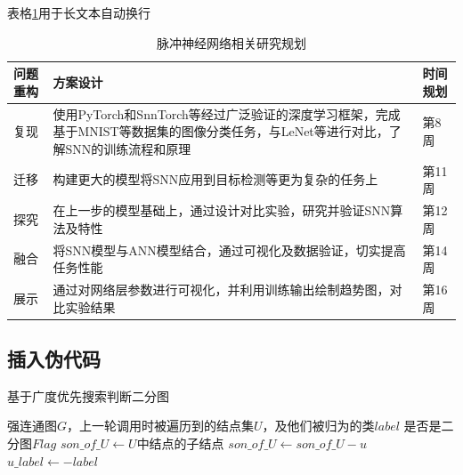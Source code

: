 \documentclass[a4paper]{article}
\begin{document}
表格\ref{table:todo}用于长文本自动换行
\begin{table}[!h]
    \centering
    \begin{tabular}{m{2cm}<{\centering} m{8cm}<{\centering} m{2cm}<{\centering}}
    \toprule
    问题重构 & 方案设计 & 时间规划 \\
    \midrule
    复现 & 使用PyTorch和SnnTorch等经过广泛验证的深度学习框架，完成基于MNIST等数据集的图像分类任务，与LeNet等进行对比，了解SNN的训练流程和原理 & 第8周\\ 
    \midrule
    迁移 & 构建更大的模型将SNN应用到目标检测等更为复杂的任务上 & 第11周\\ 
    \midrule
    探究 & 在上一步的模型基础上，通过设计对比实验，研究并验证SNN算法及特性 & 第12周\\ 
    \midrule
    融合 & 将SNN模型与ANN模型结合，通过可视化及数据验证，切实提高任务性能 & 第14周 \\ 
    \midrule
    展示 & 通过对网络层参数进行可视化，并利用训练输出绘制趋势图，对比实验结果 & 第16周 \\ 
    \bottomrule
    \end{tabular}
    \caption{脉冲神经网络相关研究规划}
    \label{table:todo}
\end{table}

\newpage
\subsection{插入伪代码}

\begin{algorithm}  
    \caption{基于广度优先搜索判断二分图}  
    \begin{algorithmic}[1] 
        \Require  强连通图$G$，上一轮调用时被遍历到的结点集$U$，及他们被归为的类$label$
          是否是二分图$Flag$
            \State $son\_of\_U\gets U$中结点的子结点
            \State
            \State {}
            \Else {}
            \State $son\_of\_U\gets son\_of\_U - u$
            \Else {}
            \State $u\_label\gets -label$
            \EndIf
            \EndIf
            \EndForEach
            \State
            \State{}
            \Else {}
            \State {}
            \EndIf
        \EndFunction  
    \end{algorithmic}  
\end{algorithm}
\end{document}
